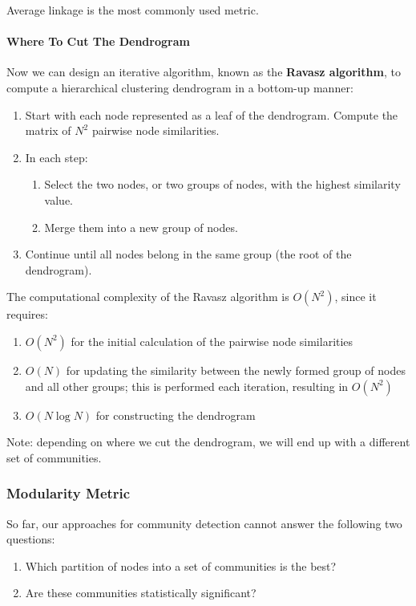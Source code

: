 \documentclass[11pt]{scrartcl} %
\begin{document}
Average linkage is the most commonly used metric.

\paragraph{Where To Cut The Dendrogram}
Now we can design an iterative algorithm, known as the \textbf{Ravasz algorithm}, to compute a hierarchical clustering dendrogram in a bottom-up manner:
\begin{enumerate}
	\item Start with each node represented as a leaf of the dendrogram. Compute the matrix of $N^2$ pairwise node similarities.
	\item In each step: 
	\begin{enumerate}
		\item Select the two nodes, or two groups of nodes, with the highest similarity value.
		\item Merge them into a new group of nodes. 
	\end{enumerate}
	\item Continue until all nodes belong in the same group (the root of the dendrogram).
\end{enumerate}

The computational complexity of the Ravasz algorithm is $O(N^2)$, since it requires:
\begin{enumerate}
	\item $O(N^2)$ for the initial calculation of the pairwise node similarities
	\item $O(N)$ for updating the similarity between the newly formed group of nodes and all other groups; this is performed each iteration, resulting in $O(N^2)$
	\item $O(N \log N)$ for constructing the dendrogram
\end{enumerate}


Note: depending on where we cut the dendrogram, we will end up with a different set of communities. 

\subsubsection{Modularity Metric}
So far, our approaches for community detection cannot answer the following two questions:
\begin{enumerate}
	\item Which partition of nodes into a set of communities is the best?
	\item Are these communities statistically significant?
\end{enumerate} 
\end{document}
